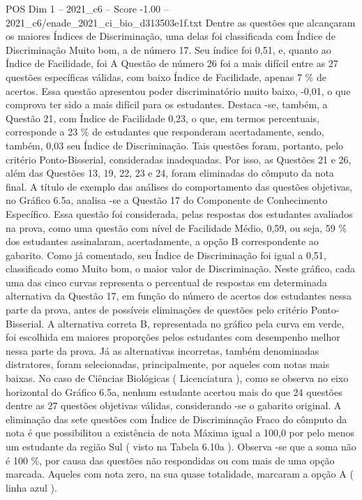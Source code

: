 \begin{textsample}{POS Dim 1 – 2021\_c6 – Score -1.00 – 2021\_c6/enade\_2021\_ci\_bio\_d313503e1f.txt}
Dentre as questões que alcançaram os maiores Índices de Discriminação, uma delas foi classificada com Índice de Discriminação Muito bom, a de número 17.
Seu índice foi 0,51, e, quanto ao Índice de Facilidade, foi A Questão de número 26 foi a mais difícil entre as 27 questões específicas válidas, com baixo Índice de Facilidade, apenas 7 \% de acertos.
Essa questão apresentou poder discriminatório muito baixo, -0,01, o que comprova ter sido a mais difícil para os estudantes.
Destaca -se, também, a Questão 21, com Índice de Facilidade 0,23, o que, em termos percentuais, corresponde a 23 \% de estudantes que responderam acertadamente, sendo, também, 0,03 seu Índice de Discriminação.
Tais questões foram, portanto, pelo critério Ponto-Bisserial, consideradas inadequadas.
Por isso, as Questões 21 e 26, além das Questões 13, 19, 22, 23 e 24, foram eliminadas do cômputo da nota final.
A título de exemplo das análises do comportamento das questões objetivas, no Gráfico 6.5a, analisa -se a Questão 17 do Componente de Conhecimento Específico.
Essa questão foi considerada, pelas respostas dos estudantes avaliados na prova, como uma questão com nível de Facilidade Médio, 0,59, ou seja, 59 \% dos estudantes assinalaram, acertadamente, a opção B correspondente ao gabarito.
Como já comentado, seu Índice de Discriminação foi igual a 0,51, classificado como Muito bom, o maior valor de Discriminação.
Neste gráfico, cada uma das cinco curvas representa o percentual de respostas em determinada alternativa da Questão 17, em função do número de acertos dos estudantes nessa parte da prova, antes de possíveis eliminações de questões pelo critério Ponto-Bisserial.
A alternativa correta B, representada no gráfico pela curva em verde, foi escolhida em maiores proporções pelos estudantes com desempenho melhor nessa parte da prova.
Já as alternativas incorretas, também denominadas distratores, foram selecionadas, principalmente, por aqueles com notas mais baixas.
No caso de Ciências Biológicas ( Licenciatura ), como se observa no eixo horizontal do Gráfico 6.5a, nenhum estudante acertou mais do que 24 questões dentre as 27 questões objetivas válidas, considerando -se o gabarito original.
A eliminação das sete questões com Índice de Discriminação Fraco do cômputo da nota é que possibilitou a existência de nota Máxima igual a 100,0 por pelo menos um estudante da região Sul ( visto na Tabela 6.10a ).
Observa -se que a soma não é 100 \%, por causa das questões não respondidas ou com mais de uma opção marcada.
Aqueles com nota zero, na sua quase totalidade, marcaram a opção A ( linha azul ).

\end{textsample}
